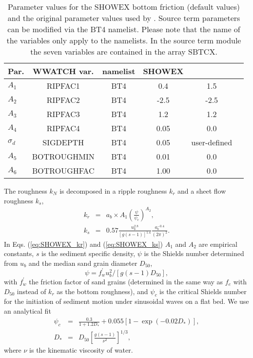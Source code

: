 \begin{table} \begin{center}
\begin{tabular}{|l|c|c|c|c|c|} \hline \hline
Par.         &  WWATCH var.           & namelist &  SHOWEX  &  \cite{tol:JPO94} \\
\hline
  $A_1$ &  RIPFAC1                    & BT4 & 0.4     & 1.5    \\
  $A_2$ &  RIPFAC2                    & BT4 & -2.5    & -2.5   \\
  $A_3$ &  RIPFAC3                    & BT4 & 1.2     & 1.2     \\
  $A_4$ &  RIPFAC4                    & BT4 & 0.05    & 0.0     \\
  $\sigma_d$ &  SIGDEPTH              & BT4 & 0.05    & user-defined  \\
  $A_5$ &  BOTROUGHMIN                & BT4 & 0.01    & 0.0     \\
  $A_6$ &  BOTROUGHFAC                & BT4 & 1.00    & 0.0     \\
\hline
\end{tabular} \end{center}
\caption{Parameter values for the SHOWEX bottom friction (default values) and the original 
  parameter values used by \cite{tol:JPO94}. Source term
  parameters can be modified via the BT4 namelist. Please
  note that the name of the variables only apply to the namelists. In the source
  term module the seven variables are contained in the array SBTCX. } \label{tab:BT4}
\botline
\end{table}

The roughness $k_{N}$ is decomposed in a ripple roughness $k_{r}$ and
a sheet flow roughness $k_{s}$,
\begin{eqnarray}
k_{r} &=&a_{b}\times A_{1}\left( \frac{\psi }{\psi _{c}}\right) ^{A_{2}}, \label{eq:SHOWEX_kr}\\
k_{s} &=&0.57\frac{u_{b}^{2.8}}{\left[ g\left( s-1\right) \right] ^{1.4}}%
\frac{a_{b}^{-0.4}}{\left( 2\pi \right) ^{2}}\label{eq:SHOWEX_ks}.
\end{eqnarray}
In Eqs. (\ref{eq:SHOWEX_kr}) and (\ref{eq:SHOWEX_ks}) $A_1$ and $A_2$ are empirical constants, $s$ is the
sediment specific density, $\psi$ is the Shields number determined from $u_b$
and the median sand grain diameter $D_{50}$,
\begin{equation}
\psi =f_{w}^{\prime }u_{b}^{2}/\left[g\left( s-1\right) D_{50}\right],
\end{equation}
with $f_{w}^{\prime }$ the friction factor of sand grains (determined in the
same way as $f_e$ with $D_{50}$ instead of $k_r$ as the bottom roughness), and
$\psi _{c}$ is the critical Shields number for the initiation of sediment
motion under sinusoidal waves on a flat bed.  We use an analytical fit
\citep{bk:Soul97}
\begin{eqnarray}
\psi _{c} &=&\frac{0.3}{1+1.2D_{*}}+0.055\left[ 1-\exp \left(
-0.02D_{*}\right) \right]\label{Soulsby_psic} , \\
D_{*} &=&D_{50}\left[ \frac{g\left( s-1\right) }{\nu ^{2}}\right] ^{1/3},
\end{eqnarray}
where $\nu $ is the kinematic viscosity of water. 

